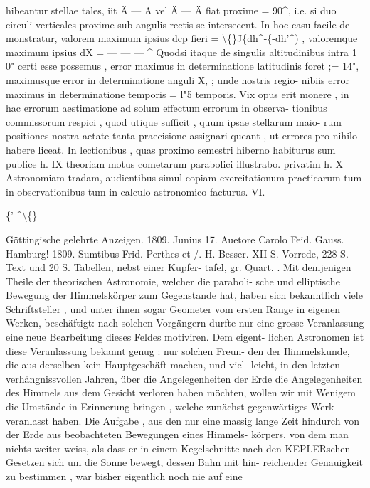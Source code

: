 \documentclass[12pt,a4paper]{article}
\begin{document}
hibeantur  stellae  tales,  iit  Ä --- A  vel  Ä --- Ä  fiat  proxime  =  90\^{},  i.e.  si  duo
circuli  verticales  proxime  sub  angulis  rectis  se  intersecent.  In  hoc  casu  facile  de-
monstratur,  valorem  maximum  ipsius  dcp  fieri  =  \textbackslash\{\}J\{dh\^{}-\{-dh'\^{}) ,  valoremque
maximum   ipsius    dX  =   --- --- ---  \^{}  Quodsi  itaque  de  singulis  altitudinibus
intra   1 0"  certi  esse  possemus ,  error  maximus  in  determinatione  latitudinis  foret
;=  14",  maximusque  error  in  determinatione  anguli  X,    ;    unde  nostris  regio-
nibiis  error  maximus  in  determinatione  temporis  =  l"5  temporis.  Vix  opus
erit  monere ,  in  hac  errorum  aestimatione  ad  solum  effectum  errorum  in  observa-
tionibus  commissorum  respici ,  quod  utique  sufficit ,  quum  ipsae  stellarum  maio-
rum  positiones  nostra  aetate  tanta  praecisione  assignari  queant ,  ut  errores  pro
nihilo  habere  liceat.
In  lectionibus ,  quas  proximo  semestri  hiberno  habiturus  sum
publice  h.  IX  theoriam  motus  cometarum  parabolici  illustrabo.
privatim  h.  X    Astronomiam  tradam,    audientibus  simul   copiam    exercitationum
practicarum  tum  in  observationibus  tum  in  calculo  astronomico  facturus.
VI.

\newpage


\newpage

\{'  \^{}\textbackslash\{\}

\newpage

Göttingische  gelehrte  Anzeigen.     1809.  Junius  17.
Auetore  Carolo  Feid.  Gauss.  Hamburg!  1809.  Sumtibus  Frid.  Perthes  et  /.  H.
Besser.  XII  S.  Vorrede,  228  S.  Text  und  20  S.  Tabellen,  nebst  einer  Kupfer-
tafel,    gr.  Quart.  .
Mit  demjenigen  Theile  der  theorischen  Astronomie,  welcher  die  paraboli-
sche und  elliptische  Bewegung  der  Himmelskörper  zum  Gegenstande  hat,  haben
sich  bekanntlich  viele  Schriftsteller ,  und  unter  ihnen  sogar  Geometer  vom  ersten
Range  in  eigenen  Werken,  beschäftigt:  nach  solchen  Vorgängern  durfte  nur  eine
grosse  Veranlassung  eine  neue  Bearbeitung  dieses  Feldes  motiviren.  Dem  eigent-
lichen Astronomen  ist  diese  Veranlassung  bekannt  genug :  nur  solchen  Freun-
den der  Ilimmelskunde,  die  aus  derselben  kein  Hauptgeschäft  machen,  und  viel-
leicht, in  den  letzten  verhängnissvollen  Jahren,  über  die  Angelegenheiten  der
Erde  die  Angelegenheiten  des  Himmels  aus  dem  Gesicht  verloren  haben  möchten,
wollen  wir  mit  Wenigem  die  Umstände  in  Erinnerung  bringen ,  welche  zunächst
gegenwärtiges  Werk  veranlasst  haben.  Die  Aufgabe ,  aus  den  nur  eine  massig
lange  Zeit  hindurch  von  der  Erde  aus  beobachteten  Bewegungen  eines  Himmels-
körpers, von  dem  man  nichts  weiter  weiss,  als  dass  er  in  einem  Kegelschnitte
nach  den  KEPLERschen  Gesetzen  sich  um  die  Sonne  bewegt,  dessen  Bahn  mit  hin-
reichender Genauigkeit  zu  bestimmen ,  war  bisher  eigentlich  noch  nie  auf  eine
\end{document}
